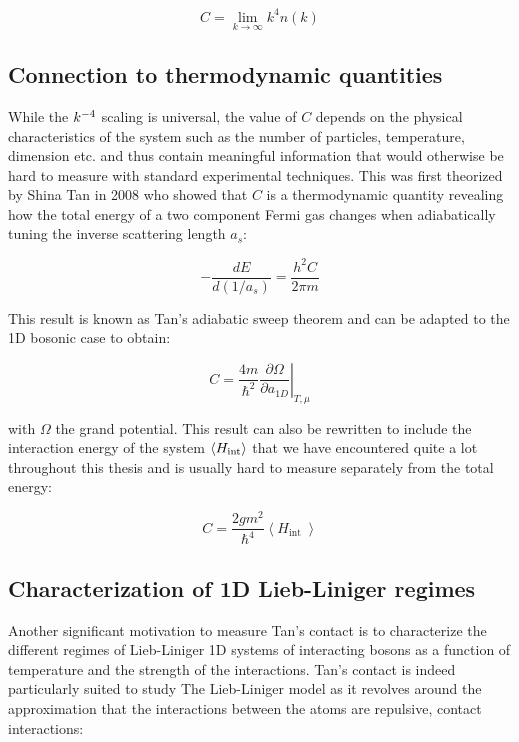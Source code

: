 \begin{equation}
    C = \lim_{k \to \infty} k^4 n(k)
\end{equation}

\subsection{Connection to thermodynamic quantities}

While the $k^{-4}$ scaling is universal, the value of $C$ depends on the physical characteristics of the system such as the number of particles, temperature, dimension etc. and thus contain meaningful information that would otherwise be hard to measure with standard experimental techniques. This was first theorized by Shina Tan in 2008 \cite{tan2008large} who showed that $C$ is a thermodynamic quantity revealing how the total energy of a two component Fermi gas changes when adiabatically tuning the inverse scattering length $a_s$:

\begin{equation}
    -\frac{d E}{d(1 / a_s)}=\frac{h^{2} C}{2 \pi m}
\end{equation}

\noindent This result is known as Tan's adiabatic sweep theorem and can be adapted to the 1D bosonic case \cite{barth2011tan} to obtain:

\begin{equation}
    C=\left.\frac{4 m}{\hbar^{2}} \frac{\partial \Omega}{\partial a_{1 D}}\right|_{T, \mu}
\end{equation}

\noindent with $\Omega$ the grand potential. This result can also be rewritten to include the interaction energy of the system $\left\langle H_{\rm{int}}\right\rangle$ that we have encountered quite a lot throughout this thesis and is usually hard to measure separately from the total energy:

\begin{equation}
    C=\frac{2 g m^{2}}{\hbar^{4}}\left\langle H_{\text {int }}\right\rangle
    \label{eq:C_with_int}
\end{equation}

\subsection{Characterization of 1D Lieb-Liniger regimes}

Another significant motivation to measure Tan's contact is to characterize the different regimes of Lieb-Liniger 1D systems of interacting bosons as a function of temperature and the strength of the interactions. Tan's contact is indeed particularly suited to study The Lieb-Liniger model as it revolves around the approximation that the interactions between the atoms are repulsive, contact interactions:

